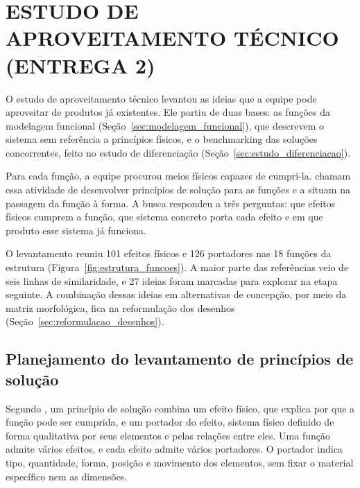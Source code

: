 
\section{ESTUDO DE APROVEITAMENTO TÉCNICO (ENTREGA 2)}\label{sec:aproveitamento_tecnico}

O estudo de aproveitamento técnico levantou as ideias que a equipe pode aproveitar de produtos já existentes. Ele partiu de duas bases: as funções da modelagem funcional (Seção~\ref{sec:modelagem_funcional}), que descrevem o sistema sem referência a princípios físicos, e o benchmarking das soluções concorrentes, feito no estudo de diferenciação (Seção~\ref{sec:estudo_diferenciacao}).

Para cada função, a equipe procurou meios físicos capazes de cumpri-la.  chamam essa atividade de desenvolver princípios de solução para as funções e a situam na passagem da função à forma. A busca respondeu a três perguntas: que efeitos físicos cumprem a função, que sistema concreto porta cada efeito e em que produto esse sistema já funciona.

O levantamento reuniu 101 efeitos físicos e 126 portadores nas 18 funções da estrutura (Figura~\ref{fig:estrutura_funcoes}). A maior parte das referências veio de seis linhas de similaridade, e 27 ideias foram marcadas para explorar na etapa seguinte. A combinação dessas ideias em alternativas de concepção, por meio da matriz morfológica, fica na reformulação dos desenhos (Seção~\ref{sec:reformulacao_desenhos}).

\subsection{Planejamento do levantamento de princípios de solução}
\label{subsec:aprov_fundamentacao}

Segundo , um princípio de solução combina um efeito físico, que explica por que a função pode ser cumprida, e um portador do efeito, sistema físico definido de forma qualitativa por seus elementos e pelas relações entre eles. Uma função admite vários efeitos, e cada efeito admite vários portadores. O portador indica tipo, quantidade, forma, posição e movimento dos elementos, sem fixar o material específico nem as dimensões.

